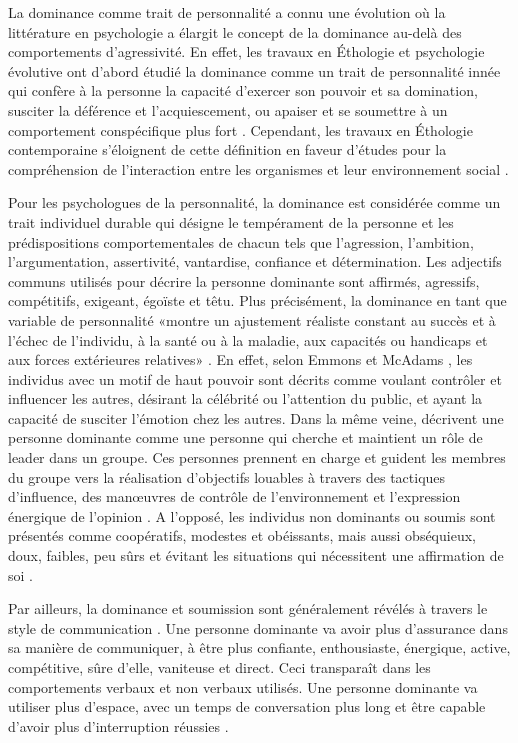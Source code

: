 La dominance comme trait de personnalité a connu une évolution où la littérature en psychologie a élargit le concept de la dominance au-delà des comportements d'agressivité.
En effet, les travaux en Éthologie et psychologie évolutive ont d'abord étudié la dominance comme un trait de personnalité innée qui confère à la personne la capacité d'exercer son pouvoir et sa domination, susciter la déférence et l'acquiescement, ou apaiser et se soumettre à un comportement conspécifique plus fort \cite{keltner1995signs,burgoon2006nonverbal}. Cependant, les travaux en Éthologie contemporaine s'éloignent de cette définition en faveur d'études pour la compréhension de l'interaction entre les organismes et leur environnement social \cite{burgoon2006nonverbal}.

Pour les psychologues de la personnalité, la dominance est considérée comme un trait individuel durable qui désigne le tempérament de la personne et les prédispositions comportementales de chacun \cite{cattell1970handbook,ridgeway1987nonverbal} tels que l'agression, l'ambition, l'argumentation,
assertivité, vantardise, confiance et détermination.
Les adjectifs communs utilisés pour décrire la personne dominante sont affirmés, agressifs, compétitifs, exigeant, égoïste et têtu. Plus précisément, la dominance en tant que variable de personnalité «montre un ajustement réaliste constant au succès et à l'échec de l'individu, à la santé ou à la maladie, aux capacités ou handicaps et aux forces extérieures relatives» \cite{cattell1970handbook,burgoon1998nature}.
En effet, selon  Emmons et McAdams \cite{emmons1991personal}, les individus avec un motif de haut pouvoir sont décrits comme voulant contrôler et influencer les autres, désirant la célébrité ou l'attention du public, et ayant la capacité de susciter l'émotion chez les autres. Dans la même veine, \cite{jackson1974personality} décrivent une personne dominante comme une personne qui cherche et maintient un rôle de leader dans un groupe. Ces personnes prennent en charge et guident les membres du groupe vers la réalisation d'objectifs louables à travers des tactiques d'influence, des manœuvres de contrôle de l'environnement et l'expression énergique de l'opinion \cite{burgoon1998nature}. 
A l'opposé, les individus non dominants ou soumis sont présentés comme coopératifs, modestes et obéissants, mais aussi obséquieux, doux, faibles, peu sûrs et évitant les situations qui nécessitent une affirmation de soi \cite{burgoon1998nature}. 

Par ailleurs, la dominance et soumission sont généralement révélés à travers le style de communication \cite{burgoon1998nature}. Une personne dominante va avoir plus d'assurance dans sa manière de communiquer, à être plus confiante, enthousiaste, énergique, active, compétitive, sûre d'elle, vaniteuse et direct. Ceci transparaît dans les comportements verbaux et non verbaux utilisés. Une personne dominante va  utiliser plus d'espace, avec un temps de conversation plus long et être capable d'avoir plus d'interruption réussies \cite{burgoon1998nature}. 

